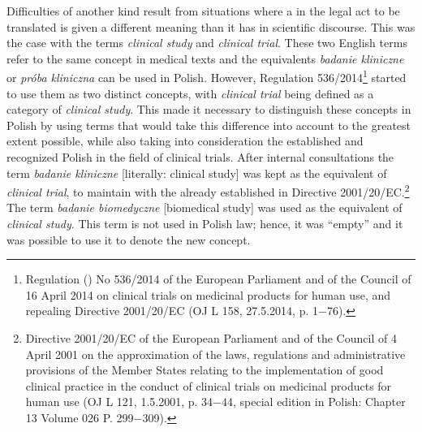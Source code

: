 \documentclass[output=paper]{langsci/langscibook}
\begin{document}
Difficulties of another kind result from situations where a  in the legal act to be translated is given a different meaning than it has in scientific discourse. This was the case with the terms \textit{clinical study} and \textit{clinical trial}. These two English terms refer to the same concept in medical texts and the equivalents \textit{badanie kliniczne} or \textit{próba kliniczna} can be used in Polish. However, Regulation 536/2014\footnote{Regulation () No 536/2014 of the European Parliament and of the Council of 16 April 2014 on clinical trials on medicinal products for human use, and repealing Directive 2001/20/EC (OJ L 158, 27.5.2014, p. 1$-$76).} started to use them as two distinct concepts, with \textit{clinical trial} being defined as a category of \textit{clinical study}. This made it necessary to distinguish these concepts in Polish by using terms that would take this difference into account to the greatest extent possible, while also taking into consideration the established and recognized Polish  in the field of clinical trials. After internal consultations the term \textit{badanie kliniczne} [literally: clinical study] was kept as the equivalent of \textit{clinical trial}, to maintain  with the  already established in Directive 2001/20/EC.\footnote{Directive 2001/20/EC of the European Parliament and of the Council of 4 April 2001 on the approximation of the laws, regulations and administrative provisions of the Member States relating to the implementation of good clinical practice in the conduct of clinical trials on medicinal products for human use (OJ L 121, 1.5.2001, p. 34$-$44, special edition in Polish: Chapter 13 Volume 026 P. 299$-$309).} The term \textit{badanie biomedyczne} [biomedical study] was used as the equivalent of \textit{clinical study}. This term is not used in Polish law; hence, it was “empty” and it was possible to use it to denote the new concept.
\end{document}
